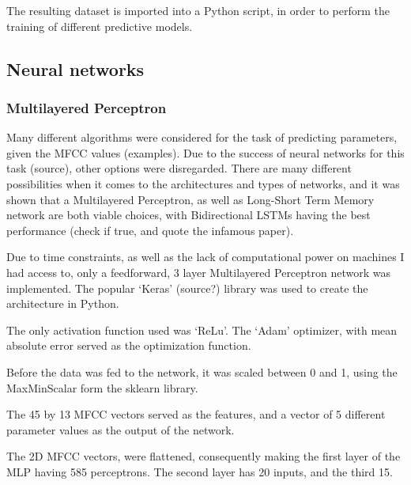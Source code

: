 The resulting dataset is imported into a Python script, in order to
perform the training of different predictive models.

\subsection{Neural networks}
\subsubsection{Multilayered Perceptron}


Many different algorithms were considered for the task of predicting
parameters, given the MFCC values (examples). Due to the success of
neural networks for this task (source), other options were
disregarded. There are many different possibilities when it comes to
the architectures and types of networks, and it was shown that a
Multilayered Perceptron, as well as Long-Short Term Memory network are
both viable choices, with Bidirectional LSTMs having the best
performance (check if true, and quote the infamous paper).

Due to time constraints, as well as the lack of computational power on
machines I had access to, only a feedforward, 3 layer Multilayered
Perceptron network was implemented. The popular `Keras' (source?)
library was used to create the architecture in Python.

The only activation function used was `ReLu'. The `Adam' optimizer,
with mean absolute error served as the optimization function.

Before the data was fed to the network, it was scaled between 0 and 1,
using the MaxMinScalar form the sklearn library.

The 45 by 13 MFCC vectors served as the features, and a vector of 5
different parameter values as the output of the network.

The 2D MFCC vectors, were flattened, consequently making the first
layer of the MLP having 585 perceptrons. The second layer has 20
inputs, and the third 15.

